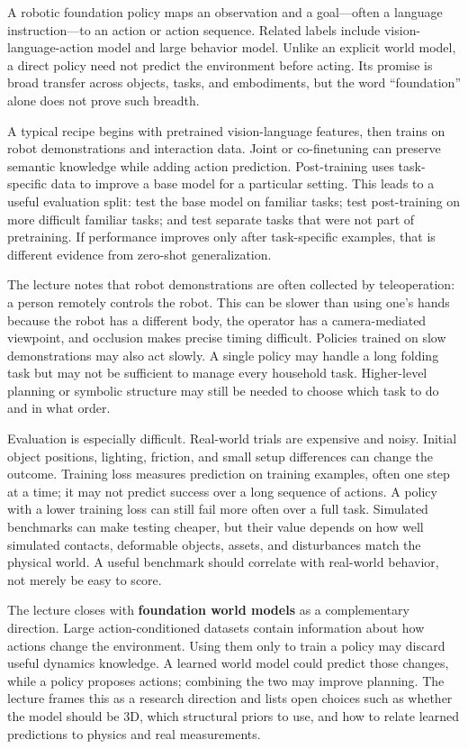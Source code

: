 A robotic foundation policy maps an observation and a goal---often a language instruction---to an action or action sequence. Related labels include vision-language-action model and large behavior model. Unlike an explicit world model, a direct policy need not predict the environment before acting. Its promise is broad transfer across objects, tasks, and embodiments, but the word ``foundation'' alone does not prove such breadth.

A typical recipe begins with pretrained vision-language features, then trains on robot demonstrations and interaction data. Joint or co-finetuning can preserve semantic knowledge while adding action prediction. Post-training uses task-specific data to improve a base model for a particular setting. This leads to a useful evaluation split: test the base model on familiar tasks; test post-training on more difficult familiar tasks; and test separate tasks that were not part of pretraining. If performance improves only after task-specific examples, that is different evidence from zero-shot generalization.

The lecture notes that robot demonstrations are often collected by teleoperation: a person remotely controls the robot. This can be slower than using one's hands because the robot has a different body, the operator has a camera-mediated viewpoint, and occlusion makes precise timing difficult. Policies trained on slow demonstrations may also act slowly. A single policy may handle a long folding task but may not be sufficient to manage every household task. Higher-level planning or symbolic structure may still be needed to choose which task to do and in what order.

Evaluation is especially difficult. Real-world trials are expensive and noisy. Initial object positions, lighting, friction, and small setup differences can change the outcome. Training loss measures prediction on training examples, often one step at a time; it may not predict success over a long sequence of actions. A policy with a lower training loss can still fail more often over a full task. Simulated benchmarks can make testing cheaper, but their value depends on how well simulated contacts, deformable objects, assets, and disturbances match the physical world. A useful benchmark should correlate with real-world behavior, not merely be easy to score.

The lecture closes with \textbf{foundation world models} as a complementary direction. Large action-conditioned datasets contain information about how actions change the environment. Using them only to train a policy may discard useful dynamics knowledge. A learned world model could predict those changes, while a policy proposes actions; combining the two may improve planning. The lecture frames this as a research direction and lists open choices such as whether the model should be 3D, which structural priors to use, and how to relate learned predictions to physics and real measurements.

